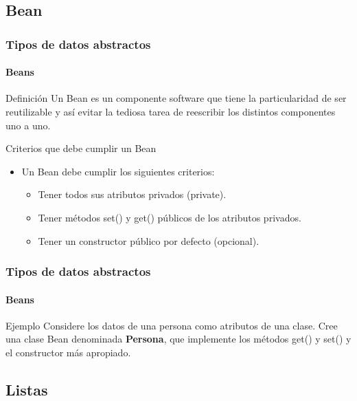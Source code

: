 \documentclass{beamer}
\begin{document}
		\subsection{Bean}

		\begin{frame}
			\frametitle{Tipos de datos abstractos}
			\framesubtitle{Beans}

			\begin{block}{Definici\'on}
				Un Bean es un componente software que tiene la particularidad de ser reutilizable y as\'i evitar la tediosa tarea de reescribir los distintos componentes uno a uno.
			\end{block}
			\begin{block}{Criterios que debe cumplir un Bean}
				\begin{itemize}
  					\item Un Bean debe cumplir los siguientes criterios:
					\begin{itemize}
						\item Tener todos sus atributos privados (private).
						\item Tener m\'etodos set() y get() p\'ublicos de los atributos privados.
						\item Tener un constructor p\'ublico por defecto (opcional).
					\end{itemize}
				\end{itemize}
			\end{block}
		\end{frame}

		\begin{frame}
			\frametitle{Tipos de datos abstractos}
			\framesubtitle{Beans}

			\begin{block}{Ejemplo}
				Considere los datos de una persona como atributos de una clase. Cree una clase Bean denominada \textbf{Persona}, que implemente los m\'etodos get() y set() y el constructor m\'as apropiado.
			\end{block}
		\end{frame}

		\subsection{Listas}
\end{document}
